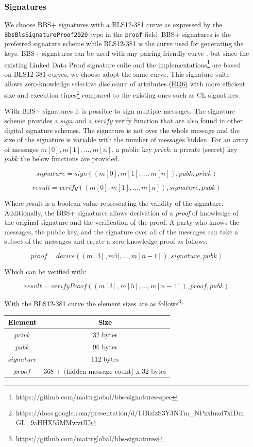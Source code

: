 \subsubsection{Signatures}

We choose BBS+ signatures with a BLS12-381 curve as expressed by the \lstinline{BbsBlsSignatureProof2020} type in the \lstinline{proof} field. BBS+ signatures is the preferred signature scheme while BLS12-381 is the curve used for generating the keys. BBS+ signatures can be used with any pairing friendly curve \parencite{irtf-cfrg-pairing-friendly-curves-09}, but since the existing Linked Data Proof signature suite \parencite{looker_steele_2021} and the implementations\footnote{https://github.com/mattrglobal/bbs-signatures-spec} are based on BLS12-381 curves, we choose adopt the same curve. This signature suite allows zero-knowledge selective disclosure of attributes \hyperref[rq:selective-disclosure]{(RQ6)} with more efficient size and execution times\footnote{https://docs.google.com/presentation/d/1JRzlzS3Y3NTm_NPzxlnud7xIDmGL_9aHHX55MMwvtlU} compared to the existing ones such as \acrshort{CL} signatures. 

With BBS+ signatures it is possible to sign multiple messages. The signature scheme provides a $sign$ and a $verify$ verify function that are also found in other digital signature schemes. The signature is not over the whole message and the size of the signature is variable with the number of messages hidden. For an array of messages $m[0], m[1], ..., m[n]$, a public key $privk$, a private (secret) key $pubk$ the below functions are provided.

\[signature = sign((m[0], m[1], ..., m[n]), pubk, privk)\]

\[result = verify((m[0], m[1], ..., m[n]), signature, pubk)\]

Where result is a boolean value representing the validity of the signature. Additionally, the BBS+ signatures allows derivation of a \textit{proof} of knowledge of the original signature and the verification of the proof. A party who knows the messages, the public key, and the signature over all of the messages can take a subset of the messages and create a zero-knowledge proof as follows:

\[proof = derive( (m[3], m5],..., m[n-1]), signature, pubk)\]

Which can be verified with: 

\[result = verifyProof( (m[3], m[5],..., m[n-1]), proof, pubk) \]

With the BLS12-381 curve the element sizes are as follows\footnote{https://github.com/mattrglobal/bbs-signatures}:
\begin{center}
\begin{tabular}{ c c }
  Element & Size    \\
  \hline
  $privk$   &   32 bytes    \\
  $pubk$    &   96 bytes    \\
  $signature$ & 112 bytes   \\
  $proof$   &   368 + (hidden message count) x 32 bytes
\end{tabular}
\end{center}

